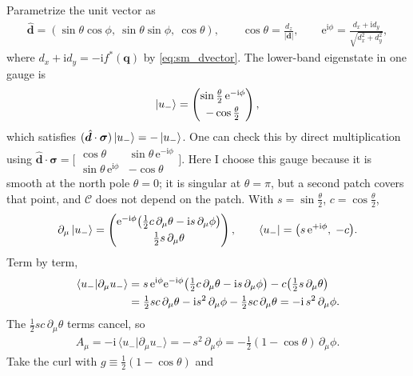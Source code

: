 \documentclass[
  aps,
  prl,
  preprint,
  amsmath,
  amssymb,
  superscriptaddress,
  floatfix
]{revtex4-2}
\newcommand{\ii}{\mathrm{i}}
\newcommand{\ee}{\mathrm{e}}
\newcommand{\pp}{\partial}
\newcommand{\C}{\mathcal{C}}
\renewcommand{\abs}[1]{\left| #1 \right|}
\begin{document}
Parametrize the unit vector as
\begin{align}
  \hat{\bm d}=(\sin\theta\cos\phi,\ \sin\theta\sin\phi,\ \cos\theta),
  \qquad
  \cos\theta=\frac{d_z}{\abs{\bm d}},
  \qquad
  \ee^{\ii\phi}=\frac{d_x+\ii d_y}{\sqrt{d_x^2+d_y^2}},
\end{align}
where $d_x+\ii d_y=-\ii f^*(\bm q)$ by \cref{eq:sm_dvector}. The
lower-band eigenstate in one gauge is
\begin{align}
  \ket{u_-}=\begin{pmatrix}\sin\tfrac\theta2\,\ee^{-\ii\phi}\\[3pt]-\cos\tfrac\theta2\end{pmatrix},
\end{align}
which satisfies $(\hat{\bm d}\cdot\bm\sigma)\ket{u_-}=-\ket{u_-}$. One
can check this by direct multiplication using $\hat{\bm d}\cdot\bm\sigma=
\big[\begin{smallmatrix}\cos\theta & \sin\theta\,\ee^{-\ii\phi}\\
\sin\theta\,\ee^{\ii\phi} & -\cos\theta\end{smallmatrix}\big]$. Here I choose this gauge because it is smooth at the north pole
$\theta=0$; it is singular at $\theta=\pi$, but a second patch covers that
point, and $\C$ does not depend on the patch.
With $s=\sin\tfrac\theta2$, $c=\cos\tfrac\theta2$,
\begin{align}
  \pp_\mu\ket{u_-}=\begin{pmatrix}\ee^{-\ii\phi}\big(\tfrac12 c\,\pp_\mu\theta-\ii s\,\pp_\mu\phi\big)\\[3pt]\tfrac12 s\,\pp_\mu\theta\end{pmatrix},
  \qquad
  \bra{u_-}=\big(s\,\ee^{+\ii\phi},\;-c\big).
\end{align}
Term by term,
\begin{align}
  \langle u_-\vert\pp_\mu u_-\rangle
  &= s\,\ee^{\ii\phi}\ee^{-\ii\phi}\big(\tfrac12 c\,\pp_\mu\theta-\ii s\,\pp_\mu\phi\big)
   -c\big(\tfrac12 s\,\pp_\mu\theta\big) \notag\\
  &= \tfrac12 sc\,\pp_\mu\theta-\ii s^2\,\pp_\mu\phi-\tfrac12 sc\,\pp_\mu\theta
  = -\ii\,s^2\,\pp_\mu\phi .
\end{align}
The $\tfrac12 sc\,\pp_\mu\theta$ terms cancel, so
\begin{align}
  A_\mu=-\ii\,\langle u_-\vert\pp_\mu u_-\rangle = -\,s^2\,\pp_\mu\phi
  = -\tfrac12(1-\cos\theta)\,\pp_\mu\phi .
  \label{eq:sm_berry_connection}
\end{align}
Take the curl with $g\equiv\tfrac12(1-\cos\theta)$ and
\end{document}
